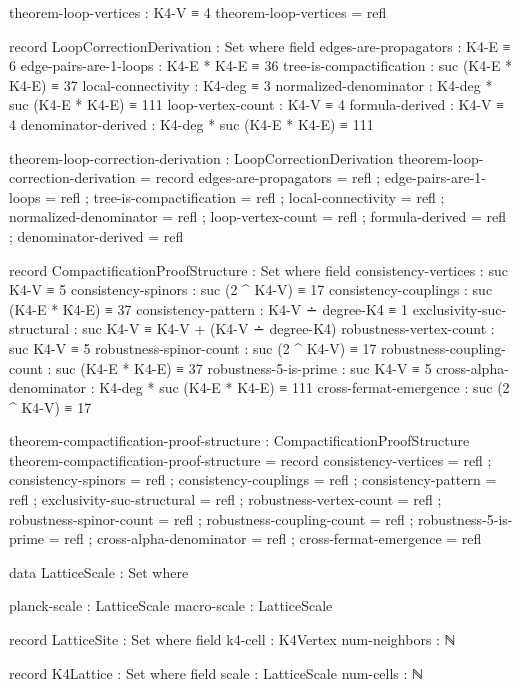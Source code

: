 \documentclass[11pt,a4paper]{book}
\begin{document}
\begin{code}
theorem-loop-vertices : K4-V ≡ 4
theorem-loop-vertices = refl
\end{code}

\begin{code}
record LoopCorrectionDerivation : Set where
  field
    edges-are-propagators : K4-E ≡ 6
    edge-pairs-are-1-loops : K4-E * K4-E ≡ 36
    tree-is-compactification : suc (K4-E * K4-E) ≡ 37
    local-connectivity : K4-deg ≡ 3
    normalized-denominator : K4-deg * suc (K4-E * K4-E) ≡ 111
    loop-vertex-count : K4-V ≡ 4
    formula-derived : K4-V ≡ 4
    denominator-derived : K4-deg * suc (K4-E * K4-E) ≡ 111

theorem-loop-correction-derivation : LoopCorrectionDerivation
theorem-loop-correction-derivation = record
  { edges-are-propagators = refl
  ; edge-pairs-are-1-loops = refl
  ; tree-is-compactification = refl
  ; local-connectivity = refl
  ; normalized-denominator = refl
  ; loop-vertex-count = refl
  ; formula-derived = refl
  ; denominator-derived = refl
  }
\end{code}

\begin{code}
record CompactificationProofStructure : Set where
  field
    consistency-vertices : suc K4-V ≡ 5
    consistency-spinors : suc (2 ^ K4-V) ≡ 17
    consistency-couplings : suc (K4-E * K4-E) ≡ 37
    consistency-pattern : K4-V ∸ degree-K4 ≡ 1
    exclusivity-suc-structural : suc K4-V ≡ K4-V + (K4-V ∸ degree-K4)
    robustness-vertex-count : suc K4-V ≡ 5
    robustness-spinor-count : suc (2 ^ K4-V) ≡ 17
    robustness-coupling-count : suc (K4-E * K4-E) ≡ 37
    robustness-5-is-prime : suc K4-V ≡ 5
    cross-alpha-denominator : K4-deg * suc (K4-E * K4-E) ≡ 111
    cross-fermat-emergence : suc (2 ^ K4-V) ≡ 17

theorem-compactification-proof-structure : CompactificationProofStructure
theorem-compactification-proof-structure = record
  { consistency-vertices = refl
  ; consistency-spinors = refl
  ; consistency-couplings = refl
  ; consistency-pattern = refl
  ; exclusivity-suc-structural = refl
  ; robustness-vertex-count = refl
  ; robustness-spinor-count = refl
  ; robustness-coupling-count = refl
  ; robustness-5-is-prime = refl
  ; cross-alpha-denominator = refl
  ; cross-fermat-emergence = refl
  }
\end{code}

\begin{code}
data LatticeScale : Set where

  planck-scale : LatticeScale
  macro-scale  : LatticeScale

record LatticeSite : Set where
  field
    k4-cell : K4Vertex
    num-neighbors : ℕ

record K4Lattice : Set where
  field
    scale : LatticeScale
    num-cells : ℕ

\end{code}
\end{document}
